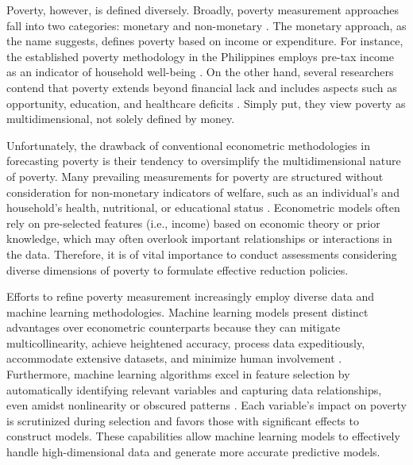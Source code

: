 \documentclass[a4paper,fleqn]{cas-sc}
\begin{document}
Poverty, however, is defined diversely. Broadly, poverty measurement approaches fall into two categories: monetary and non-monetary \citep{decerf2023preference}. The monetary approach, as the name suggests, defines poverty based on income or expenditure. For instance, the established poverty methodology in the Philippines employs pre-tax income as an indicator of household well-being \citep{albert2023analysis, briones2021income}. On the other hand, several researchers contend that poverty extends beyond financial lack and includes aspects such as opportunity, education, and healthcare deficits \citep{alkire2015multidimensional}. Simply put, they view poverty as multidimensional, not solely defined by money.

Unfortunately, the drawback of conventional econometric methodologies in forecasting poverty is their tendency to oversimplify the multidimensional nature of poverty. Many prevailing measurements for poverty are structured without consideration for non-monetary indicators of welfare, such as an individual’s and household’s health, nutritional, or educational status \citep{watson2017non}. Econometric models often rely on pre-selected features (i.e., income) based on economic theory or prior knowledge, which may often overlook important relationships or interactions in the data. Therefore, it is of vital importance to conduct assessments considering diverse dimensions of poverty to formulate effective reduction policies.

Efforts to refine poverty measurement increasingly employ diverse data and machine learning methodologies. Machine learning models present distinct advantages over econometric counterparts because they can mitigate multicollinearity, achieve heightened accuracy, process data expeditiously, accommodate extensive datasets, and minimize human involvement \citep{shobana2021forecasting}. Furthermore, machine learning algorithms excel in feature selection by automatically identifying relevant variables and capturing data relationships, even amidst nonlinearity or obscured patterns \citep{li2017feature}. Each variable’s impact on poverty is scrutinized during selection and favors those with significant effects to construct models. These capabilities allow machine learning models to effectively handle high-dimensional data and generate more accurate predictive models.
\end{document}
